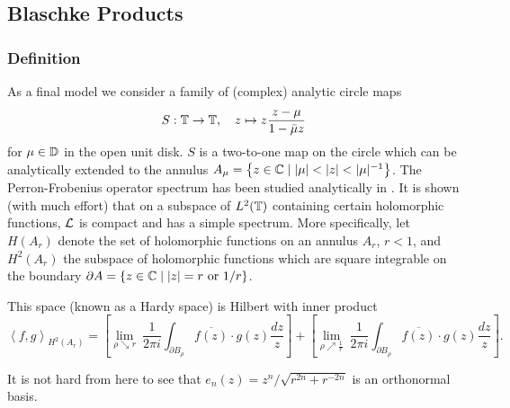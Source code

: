 \subsection{Blaschke Products}\label{sec:blaschke}

\subsubsection{Definition}

As a final model we consider a family of (complex) analytic circle maps
\begin{equation}
    \label{eq:blaschke}
    S : \mathbb{T} \to \mathbb{T},\quad z \mapsto z \frac{z - \mu}{1 - \bar{\mu} z} 
\end{equation}
for $\mu \in \mathbb{D}$ in the open unit disk. $S$ is a two-to-one map on the circle 
which can be analytically extended to the annulus 
$A_\mu = \left\{ z \in \mathbb{C} \mid |\mu| < |z| < |\mu|^{-1} \right\}$. The Perron-Frobenius 
operator spectrum has been studied analytically in \cite{Slipantschuk}. It is shown 
(with much effort) that on a subspace of $L^2 (\mathbb{T})$ containing certain holomorphic 
functions, $\mathcal{L}$ is compact and has a simple spectrum. More specifically, let 
$H (A_r)$ denote the set of holomorphic functions on an annulus $A_r$, $r < 1$, and $H^2 (A_r)$ 
the subspace of holomorphic functions which are square integrable on the boundary 
$\partial A = \left\{ z \in \mathbb{C} \mid |z| = r \text{ or } 1/r \right\}$. 

This space (known as a Hardy space) is Hilbert with inner product 
\begin{equation}
    {\left\langle f, g \right\rangle}_{H^2 (A_r)}
    = \left[ \lim_{\rho \searrow r}\ \frac{1}{2 \pi i} \int_{\partial B_\rho} \overline{f (z)} \cdot g (z) \frac{dz}{z} \right]
    + \left[ \lim_{\rho \nearrow \frac{1}{r}}\ \frac{1}{2 \pi i} \int_{\partial B_\rho} \overline{f (z)} \cdot g (z) \frac{dz}{z} \right] . 
\end{equation}

It is not hard from here to see that $e_n (z) = z^n / \sqrt{r^{2n} + r^{-2n}}$ is an 
orthonormal basis. 

